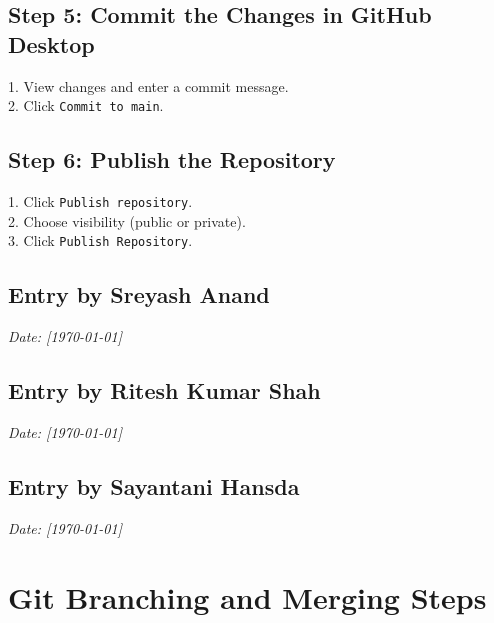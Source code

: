 \documentclass[a4paper,12pt]{article}
\begin{document}
\subsection*{Step 5: Commit the Changes in GitHub Desktop}
1. View changes and enter a commit message.\\
2. Click \texttt{Commit to main}.

\subsection*{Step 6: Publish the Repository}
1. Click \texttt{Publish repository}.\\
2. Choose visibility (public or private).\\
3. Click \texttt{Publish Repository}.

\subsection*{Entry by Sreyash Anand}
\textit{Date: [\today]}\\

\subsection*{Entry by Ritesh Kumar Shah}
\textit{Date: [\today]}\\

\subsection*{Entry by Sayantani Hansda}
\textit{Date: [\today]}\\


\section*{Git Branching and Merging Steps}
\end{document}
